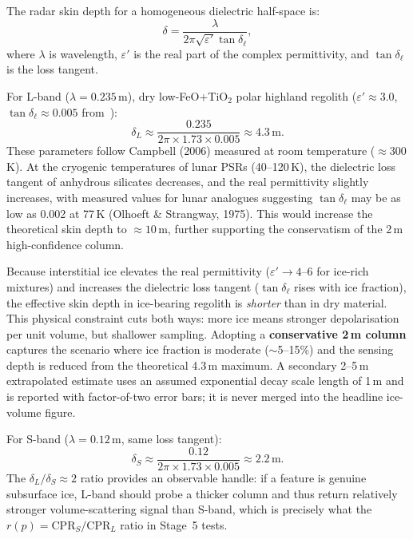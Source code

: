 \documentclass[10pt,conference]{IEEEtran}
\newcommand{\CPR}{\mathrm{CPR}}
\begin{document}
The radar skin depth for a homogeneous dielectric half-space is:
\begin{equation}
\delta = \frac{\lambda}{2\pi\sqrt{\varepsilon'}\tan\delta_{\ell}},
\label{eq:skindepth}
\end{equation}
where $\lambda$ is wavelength, $\varepsilon'$ is the real part of the
complex permittivity, and $\tan\delta_{\ell}$ is the loss tangent.

For L-band ($\lambda = 0.235$\,m), dry low-FeO+TiO$_2$ polar highland
regolith ($\varepsilon' \approx 3.0$, $\tan\delta_{\ell} \approx 0.005$
from~\cite{campbell2006}):
\begin{equation}
\delta_L \approx \frac{0.235}{2\pi \times 1.73 \times 0.005}
        \approx 4.3\,\text{m}.
\label{eq:deltanum}
\end{equation}
These parameters follow Campbell (2006) measured at room temperature ($\approx 300$\,K). At the cryogenic temperatures of lunar PSRs (40--120\,K), the dielectric loss tangent of anhydrous silicates decreases, and the real permittivity slightly increases, with measured values for lunar analogues suggesting $\tan\delta_\ell$ may be as low as 0.002 at 77\,K (Olhoeft \& Strangway, 1975). This would increase the theoretical skin depth to $\approx 10$\,m, further supporting the conservatism of the 2\,m high-confidence column.

Because interstitial ice elevates the real permittivity
($\varepsilon' \to 4$--$6$ for ice-rich mixtures) and increases
the dielectric loss tangent ($\tan\delta_\ell$ rises with ice fraction),
the effective skin depth in ice-bearing regolith is \emph{shorter} than
in dry material.
This physical constraint cuts both ways: more ice means stronger
depolarisation per unit volume, but shallower sampling.
Adopting a \textbf{conservative 2\,m column} captures the scenario where
ice fraction is moderate ($\sim$5--15\%) and the sensing depth is
reduced from the theoretical 4.3\,m maximum.
A secondary 2--5\,m extrapolated estimate uses an assumed exponential
decay scale length of 1\,m and is reported with factor-of-two error bars;
it is never merged into the headline ice-volume figure.

For S-band ($\lambda = 0.12$\,m, same loss tangent):
\begin{equation}
\delta_S \approx \frac{0.12}{2\pi \times 1.73 \times 0.005}
        \approx 2.2\,\text{m}.
\label{eq:deltasnum}
\end{equation}
The $\delta_L / \delta_S \approx 2$ ratio provides an observable handle:
if a feature is genuine subsurface ice, L-band should probe a thicker
column and thus return relatively stronger volume-scattering signal
than S-band, which is precisely what the $r(p) = \CPR_S / \CPR_L$
ratio in Stage~5 tests.
\end{document}
